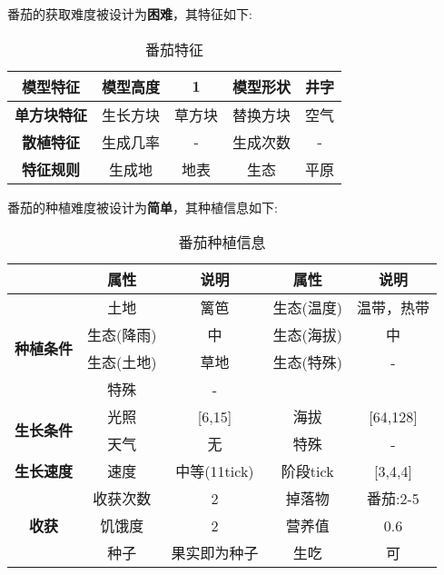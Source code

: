 番茄的获取难度被设计为\textbf{困难}，其特征如下:
\begin{table}[H]
    \centering
    \caption{番茄特征}
    \label{table:番茄特征}
    \setlength{\tabcolsep}{4mm}
    \begin{tabular}{c|cc|cc}
        \toprule
        \textbf{模型特征}   & 模型高度 & 1      & 模型形状 & 井字 \\
        \midrule
        \textbf{单方块特征} & 生长方块 & 草方块 & 替换方块 & 空气 \\
        \midrule
        \textbf{散植特征}   & 生成几率 & -      & 生成次数 & -    \\
        \midrule
        \textbf{特征规则}   & 生成地   & 地表   & 生态     & 平原 \\
        \bottomrule
    \end{tabular}
\end{table}


番茄的种植难度被设计为\textbf{简单}，其种植信息如下:

\begin{table}[H]
    \centering
    \caption{番茄种植信息}
    \label{table:番茄种植信息}
    \setlength{\tabcolsep}{4mm}
    \begin{tabular}{c|cc|cc}
        \toprule
                                           & \textbf{属性} & \textbf{说明} & \textbf{属性} & \textbf{说明} \\
        \midrule
        \multirow{4}{*}{\textbf{种植条件}} & 土地          & 篱笆          & 生态(温度)    & 温带，热带    \\
                                           & 生态(降雨)    & 中            & 生态(海拔)    & 中            \\
                                           & 生态(土地)    & 草地          & 生态(特殊)    & -             \\
                                           & 特殊          & -                                             \\
        \midrule
        \multirow{2}{*}{\textbf{生长条件}} & 光照          & [6,15]        & 海拔          & [64,128]      \\
                                           & 天气          & 无            & 特殊          & -             \\
        \midrule
        \textbf{生长速度}                  & 速度          & 中等(11tick)  & 阶段tick      & [3,4,4]       \\
        \midrule
        \multirow{3}{*}{\textbf{收获}}     & 收获次数      & 2             & 掉落物        & 番茄:2-5      \\
                                           & 饥饿度        & 2             & 营养值        & 0.6           \\
                                           & 种子          & 果实即为种子  & 生吃          & 可            \\
        \bottomrule
    \end{tabular}
\end{table}

